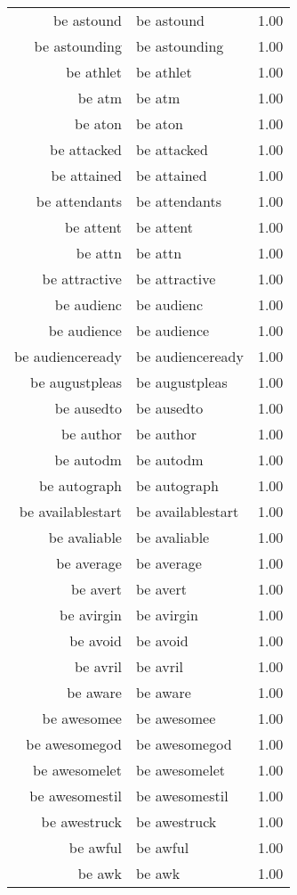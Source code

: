 \begin{table}[ht]
\begin{tabular}{rlr}
  be astound & be astound & 1.00 \\ 
  be astounding & be astounding & 1.00 \\ 
  be athlet & be athlet & 1.00 \\ 
  be atm & be atm & 1.00 \\ 
  be aton & be aton & 1.00 \\ 
  be attacked & be attacked & 1.00 \\ 
  be attained & be attained & 1.00 \\ 
  be attendants & be attendants & 1.00 \\ 
  be attent & be attent & 1.00 \\ 
  be attn & be attn & 1.00 \\ 
  be attractive & be attractive & 1.00 \\ 
  be audienc & be audienc & 1.00 \\ 
  be audience & be audience & 1.00 \\ 
  be audienceready & be audienceready & 1.00 \\ 
  be augustpleas & be augustpleas & 1.00 \\ 
  be ausedto & be ausedto & 1.00 \\ 
  be author & be author & 1.00 \\ 
  be autodm & be autodm & 1.00 \\ 
  be autograph & be autograph & 1.00 \\ 
  be availablestart & be availablestart & 1.00 \\ 
  be avaliable & be avaliable & 1.00 \\ 
  be average & be average & 1.00 \\ 
  be avert & be avert & 1.00 \\ 
  be avirgin & be avirgin & 1.00 \\ 
  be avoid & be avoid & 1.00 \\ 
  be avril & be avril & 1.00 \\ 
  be aware & be aware & 1.00 \\ 
  be awesomee & be awesomee & 1.00 \\ 
  be awesomegod & be awesomegod & 1.00 \\ 
  be awesomelet & be awesomelet & 1.00 \\ 
  be awesomestil & be awesomestil & 1.00 \\ 
  be awestruck & be awestruck & 1.00 \\ 
  be awful & be awful & 1.00 \\ 
  be awk & be awk & 1.00 \\ 

\end{tabular}
\end{table}
